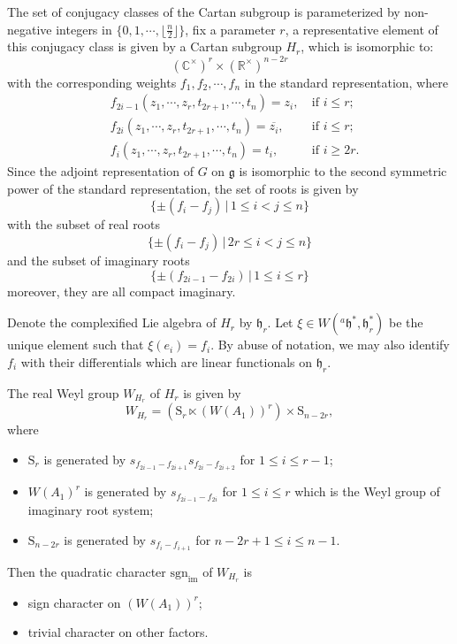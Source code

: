 \documentclass[12pt, a4paper]{amsart}
\numberwithin{equation}{section}
\newcommand{\BC}{{\mathbb {C}}}
\newcommand{\BR}{{\mathbb {R}}}
\newcommand{\fg}{\mathfrak{g}}
\newcommand{\fh}{\mathfrak{h}}
\newcommand{\sgn}{{\mathrm{sgn}}}
\newcommand{\set}[2]{\{#1\,|\,#2\}}
\renewcommand{\bar}{\overline}
\begin{document}
The set of conjugacy classes of the Cartan subgroup is parameterized by non-negative integers in $\{0,1,\cdots,\lfloor \frac{n}{2}\rfloor\}$, fix a parameter $r$, a representative element of this conjugacy class is given by a Cartan subgroup $H_r$, which is isomorphic to:
$$(\BC^{\times})^r \times (\BR^{\times})^{n-2r}$$
with the corresponding weights $f_1,f_2,\cdots ,f_n$ in the standard representation, where
\begin{align}
    &f_{2i-1}(z_1,\cdots,z_r,t_{2r+1},\cdots,t_{n}) = z_i, \ & \textrm{if $i \leq r$};\\
    &f_{2i}(z_1,\cdots,z_r,t_{2r+1},\cdots,t_{n}) = \bar{z_i}, \ & \textrm{if $i \leq r$};\\
    &f_{i}(z_1,\cdots,z_r,t_{2r+1},\cdots,t_{n}) = t_i, \ & \textrm{if $i \geq 2r$}.
\end{align}
Since the adjoint representation of $G$ on $\fg$ is isomorphic to the second symmetric power of the standard representation, the set of roots is given by
$$\set{\pm (f_i - f_j)}{1 \leq i < j \leq n}$$
with the subset of real roots
$$\set{\pm(f_i - f_j)}{2r \leq i < j \leq n}$$
and the subset of imaginary roots
$$\set{\pm(f_{2i-1} - f_{2i})}{1 \leq i \leq r}$$
moreover, they are all compact imaginary. 

Denote the complexified Lie algebra of $H_r$ by $\fh_r$. Let $\xi \in W({^{a}\fh}^*,\fh_r^*)$ be the unique element such that $\xi(e_i) = f_i$. By abuse of notation, we may also identify $f_i$ with their differentials which are linear functionals on $\fh_r$.

The real Weyl group $W_{H_r}$ of $H_r$ is given by
$$W_{H_r} = (\mathrm{S}_r \ltimes  (W(A_1))^r) \times \mathrm{S}_{n-2r},$$
where 
\begin{itemize}
    \item $\mathrm{S}_r$ is generated by $s_{f_{2i-1}-f_{2i+1}}s_{f_{2i}-f_{2i+2}}$ for $1 \leq i \leq r-1$;
    \item $W(A_1)^r$ is generated by $s_{f_{2i-1}-f_{2i}}$ for $1 \leq i \leq r$ which is the Weyl group of imaginary root system;
    \item $\mathrm{S}_{n-2r}$ is generated by $s_{f_{i}-f_{i+1}}$ for $n-2r +1 \leq i \leq n-1$.
\end{itemize}

Then the quadratic character $\sgn_{\mathrm{im}}$ of $W_{H_r}$ is

\begin{itemize}
    \item sign character on $(W(A_1))^r$;
    \item trivial character on other factors.
\end{itemize}
\end{document}
